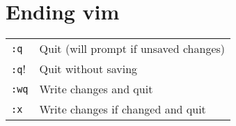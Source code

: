 \section{Ending vim}
\begin{tabular}{@{}p{\the\MyLen}%
				@{}p{\linewidth-\the\MyLen}}
\verb!:q!			& Quit (will prompt if unsaved changes)\\
\verb!:q!!			& Quit without saving\\
\verb!:wq!			& Write changes and quit\\
\verb!:x!			& Write changes if changed and quit
\end{tabular}